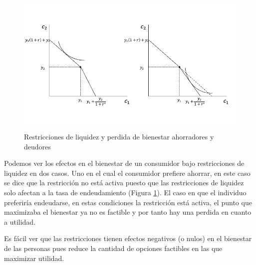 \begin{figure}[t]
    \centering
    \caption{Restricciones de liquidez y perdida de bienestar ahorradores y deudores}
    \includegraphics[width=\textwidth]{Figuras/CI Restricciones de liquidez.jpeg}
    \label{fig: Restricciones liquidez bienestar}
\end{figure}

Podemos ver los efectos en el bienestar de un consumidor bajo restricciones de liquidez en dos casos. Uno en el cual el consumidor prefiere ahorrar, en este caso se dice que la restricción no está activa puesto que las restricciones de liquidez solo afectan a la tasa de endeudamiento (Figura \ref{fig: Restricciones liquidez bienestar}). El caso en que el individuo preferiría endeudarse, en estas condiciones la restricción está activa, el punto que maximizaba el bienestar ya no es factible y por tanto hay una perdida en cuanto a utilidad. 

Es fácil ver que las restricciones tienen efectos negativos (o nulos) en el bienestar de las personas pues reduce la cantidad de opciones factibles en las que maximizar utilidad. 